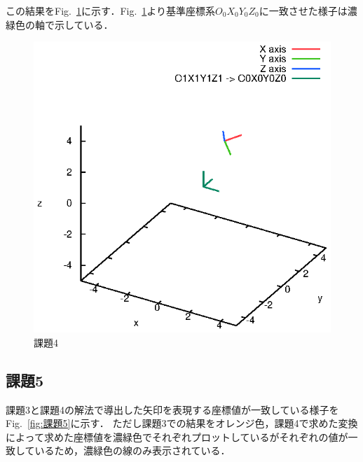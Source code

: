 \documentclass[a4paper,10pt]{jsarticle}
\begin{document}
この結果をFig.~\ref{fig:課題4}に示す．Fig.~\ref{fig:課題4}より基準座標系$O_0X_0Y_0Z_0$に一致させた様子は濃緑色の軸で示している．

\begin{figure}[htb]
  \begin{center}
    \includegraphics[clip,width=14cm]{fig/eps/4.eps}
  \end{center}
  \caption{課題4}
  \label{fig:課題4}
\end{figure}

\subsection{課題5}
課題3と課題4の解法で導出した矢印を表現する座標値が一致している様子をFig.~\ref{fig:課題5}に示す．
ただし課題3での結果をオレンジ色，課題4で求めた変換によって求めた座標値を濃緑色でそれぞれプロットしているがそれぞれの値が一致しているため，濃緑色の線のみ表示されている．
\end{document}
